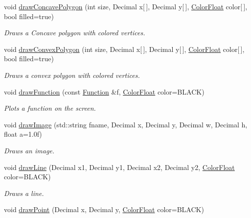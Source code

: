 \begin{DoxyCompactItemize}
void \hyperlink{classtsgl_1_1_cartesian_canvas_a06998a90e2f7d32c2571d3e92c3f4668}{draw\+Concave\+Polygon} (int size, Decimal x\mbox{[}$\,$\mbox{]}, Decimal y\mbox{[}$\,$\mbox{]}, \hyperlink{structtsgl_1_1_color_float}{Color\+Float} color\mbox{[}$\,$\mbox{]}, bool filled=true)
\begin{DoxyCompactList}\small\item\em Draws a Concave polygon with colored vertices. \end{DoxyCompactList}\item 
void \hyperlink{classtsgl_1_1_cartesian_canvas_a0e8d38857d592eca0b203b0dfff2cb31}{draw\+Convex\+Polygon} (int size, Decimal x\mbox{[}$\,$\mbox{]}, Decimal y\mbox{[}$\,$\mbox{]}, \hyperlink{structtsgl_1_1_color_float}{Color\+Float} color\mbox{[}$\,$\mbox{]}, bool filled=true)
\begin{DoxyCompactList}\small\item\em Draws a convex polygon with colored vertices. \end{DoxyCompactList}\item 
void \hyperlink{classtsgl_1_1_cartesian_canvas_a2940c104483fe0ad43e97ad4590e3683}{draw\+Function} (const \hyperlink{classtsgl_1_1_function}{Function} \&f, \hyperlink{structtsgl_1_1_color_float}{Color\+Float} color=B\+L\+A\+C\+K)
\begin{DoxyCompactList}\small\item\em Plots a function on the screen. \end{DoxyCompactList}\item 
void \hyperlink{classtsgl_1_1_cartesian_canvas_a9c30ad7d75eec8db38fee978504594fd}{draw\+Image} (std\+::string fname, Decimal x, Decimal y, Decimal w, Decimal h, float a=1.\+0f)
\begin{DoxyCompactList}\small\item\em Draws an image. \end{DoxyCompactList}\item 
void \hyperlink{classtsgl_1_1_cartesian_canvas_ace015a630f1ff280b2ecd6a864cdc5e2}{draw\+Line} (Decimal x1, Decimal y1, Decimal x2, Decimal y2, \hyperlink{structtsgl_1_1_color_float}{Color\+Float} color=B\+L\+A\+C\+K)
\begin{DoxyCompactList}\small\item\em Draws a line. \end{DoxyCompactList}\item 
void \hyperlink{classtsgl_1_1_cartesian_canvas_a2ef932501dd03f885fd0ff30ddffae01}{draw\+Point} (Decimal x, Decimal y, \hyperlink{structtsgl_1_1_color_float}{Color\+Float} color=B\+L\+A\+C\+K)

\end{DoxyCompactItemize}
